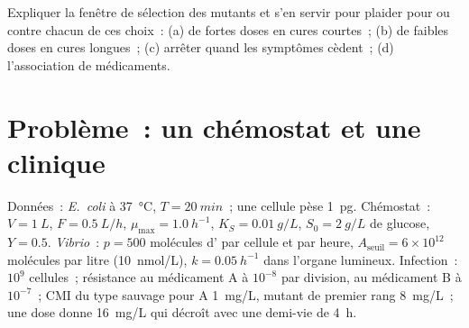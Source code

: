\begin{exercise}[$\star\star\star$]\label{exo:b3:bacteriology:12}
Expliquer la fenêtre de sélection des mutants et s'en servir pour
plaider pour ou contre chacun de ces choix~: (a) de fortes doses en
cures courtes~; (b) de faibles doses en cures longues~; (c) arrêter
quand les symptômes cèdent~; (d) l'association de médicaments.
\end{exercise}

\section{Problème~: un chémostat et une clinique}

\begin{problem}
\label{pb:b3:bacteriology:1}
Données~: \emph{E.~coli} à \qty{37}{\celsius}, $T = \qty{20}{min}$~; une
cellule pèse \qty{1}{pg}. Chémostat~: $V = \qty{1}{L}$,
$F = \qty{0.5}{L/h}$, $\mu_{\max} = \qty{1.0}{h^{-1}}$,
$K_{S} = \qty{0.01}{g/L}$, $S_{0} =
\qty{2}{g/L}$ de glucose, $Y = 0.5$. \emph{Vibrio}~: $p = 500$
molécules d' par cellule et par heure,
$A_{\text{seuil}} = 6\times 10^{12}$ molécules par litre
(\qty{10}{nmol/L}), $k = \qty{0.05}{h^{-1}}$ dans l'organe lumineux.
Infection~: $10^{9}$ cellules~; résistance au médicament A à $10^{-8}$
par division, au médicament B à $10^{-7}$~; CMI du type sauvage pour A
\qty{1}{mg/L}, mutant de premier rang \qty{8}{mg/L}~; une dose donne
\qty{16}{mg/L} qui décroît avec une demi-vie de \qty{4}{h}.


\end{problem}
